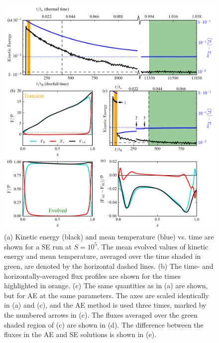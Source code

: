 \documentclass[aps, pre, onecolumn, nofootinbib, notitlepage, groupedaddress, amsfonts, amssymb, amsmath, longbibliography]{revtex4-1}
\begin{document}
\begin{figure}[p!]
\includegraphics[width=\textwidth]{./figs/time_trace.png}
\caption{(a) Kinetic energy (black) and mean temperature (blue)  vs. time are shown
for a SE run at $S = 10^5$. The mean evolved values of kinetic energy and mean temperature,
averaged over the time shaded in green,
are denoted by the horizontal dashed lines. (b) The time- and horizontally-averaged
flux profiles are shown for the times highlighted in orange.
(c) The same quantities as in (a) are shown, but for AE at the same parameters.
The axes are scaled identically in (a) and (c), and the AE method is used three times, marked by
the numbered arrows in (c). The fluxes averaged over the green shaded region of (c)
are shown in (d). The difference between
the fluxes in the AE and SE solutions is shown in (e). \label{fig:time_trace} }
\end{figure}
\end{document}
